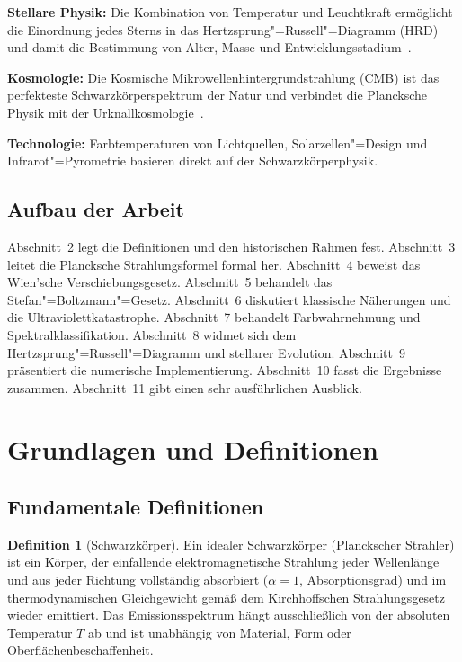 ﻿\documentclass[a4paper,12pt]{article}
\theoremstyle{definition}
\newtheorem{definition}{Definition}
\begin{document}
\textbf{Stellare Physik:} Die Kombination von Temperatur und Leuchtkraft ermöglicht
die Einordnung jedes Sterns in das Hertzsprung"=Russell"=Diagramm (HRD) und damit
die Bestimmung von Alter, Masse und Entwicklungsstadium~\cite{salaris2005}.

\textbf{Kosmologie:} Die Kosmische Mikrowellenhintergrundstrahlung (CMB) ist das
perfekteste Schwarzkörperspektrum der Natur und verbindet die Plancksche Physik
mit der Urknallkosmologie~\cite{fixsen2009}.

\textbf{Technologie:} Farbtemperaturen von Lichtquellen, Solarzellen"=Design und
Infrarot"=Pyrometrie basieren direkt auf der Schwarzkörperphysik.

\subsection{Aufbau der Arbeit}

Abschnitt~2 legt die Definitionen und den historischen Rahmen fest. Abschnitt~3
leitet die Plancksche Strahlungsformel formal her. Abschnitt~4 beweist das
Wien'sche Verschiebungsgesetz. Abschnitt~5 behandelt das Stefan"=Boltzmann"=Gesetz.
Abschnitt~6 diskutiert klassische Näherungen und die Ultraviolettkatastrophe.
Abschnitt~7 behandelt Farbwahrnehmung und Spektralklassifikation. Abschnitt~8
widmet sich dem Hertzsprung"=Russell"=Diagramm und stellarer Evolution.
Abschnitt~9 präsentiert die numerische Implementierung. Abschnitt~10 fasst
die Ergebnisse zusammen. Abschnitt~11 gibt einen sehr ausführlichen Ausblick.

\section{Grundlagen und Definitionen}

\subsection{Fundamentale Definitionen}

\begin{definition}[Schwarzkörper]
    Ein idealer Schwarzkörper (Planckscher Strahler) ist ein Körper, der einfallende
    elektromagnetische Strahlung jeder Wellenlänge und aus jeder Richtung vollständig
    absorbiert ($\alpha = 1$, Absorptionsgrad) und im thermodynamischen Gleichgewicht
    gemäß dem Kirchhoffschen Strahlungsgesetz wieder emittiert. Das Emissionsspektrum
    hängt ausschließlich von der absoluten Temperatur $T$ ab und ist unabhängig von
    Material, Form oder Oberflächenbeschaffenheit.
\end{definition}
\end{document}
